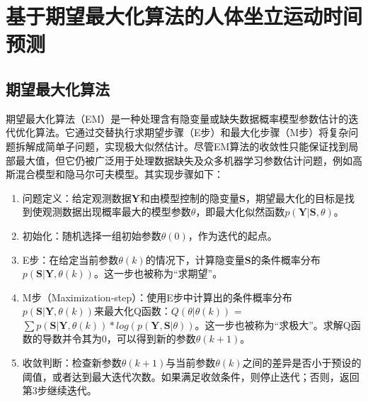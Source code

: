 \section{基于期望最大化算法的人体坐立运动时间预测}
\subsection{期望最大化算法}
期望最大化算法（EM）是一种处理含有隐变量或缺失数据概率模型参数估计的迭代优化算法。它通过交替执行求期望步骤（E步）和最大化步骤（M步）将复杂问题拆解成简单子问题，实现极大似然估计。尽管EM算法的收敛性只能保证找到局部最大值，但它仍被广泛用于处理数据缺失及众多机器学习参数估计问题，例如高斯混合模型和隐马尔可夫模型。其实现步骤如下：

\begin{enumerate}
\item 问题定义：给定观测数据$\mathbf{Y}$和由模型控制的隐变量$\mathbf{S}$，期望最大化的目标是找到使观测数据出现概率最大的模型参数$θ$，即最大化似然函数$p(\mathbf{Y}|\mathbf{S}, θ)$。

\item 初始化：随机选择一组初始参数$θ(0)$，作为迭代的起点。

\item E步：在给定当前参数$θ(k)$的情况下，计算隐变量$\mathbf{S}$的条件概率分布$p(\mathbf{S}|\mathbf{Y}, θ(k))$。这一步也被称为“求期望”。

\item M步（Maximization-step）：使用E步中计算出的条件概率分布$p(\mathbf{S}|\mathbf{Y}, θ(k))$来最大化Q函数：$Q(θ|θ(k))$ = $\sum p(\mathbf{S}|\mathbf{Y}, θ(k)) * log(p(\mathbf{Y}, \mathbf{S}|θ))$。这一步也被称为``求极大''。求解Q函数的导数并令其为0，可以得到新的参数$θ(k+1)$。

\item 收敛判断：检查新参数$θ(k+1)$与当前参数$θ(k)$之间的差异是否小于预设的阈值，或者达到最大迭代次数。如果满足收敛条件，则停止迭代；否则，返回第3步继续迭代。
\end{enumerate}

